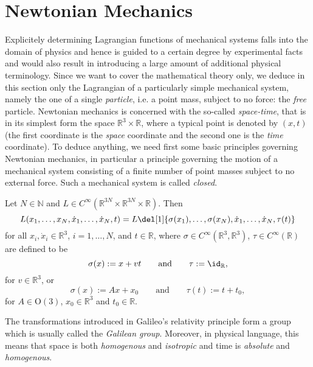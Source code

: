 \section*{Newtonian Mechanics}
Explicitely determining Lagrangian functions of mechanical systems falls into the domain of physics and hence is guided to a certain degree by experimental facts and would also result in introducing a large amount of additional physical terminology. Since we want to cover the mathematical theory only, we deduce in this section only the Lagrangian of a particularly simple mechanical system, namely the one of a single \emph{particle}, i.e. a point mass, subject to no force: the \emph{free} particle. Newtonian mechanics is concerned with the so-called \emph{space-time}, that is in its simplest form the space $\mathbb{R}^3 \times \mathbb{R}$, where a typical point is denoted by $(x,t)$ (the first coordinate is the \emph{space} coordinate and the second one is the \emph{time} coordinate). To deduce anything, we need first some basic principles governing Newtonian mechanics, in particular a principle governing the motion of a mechanical system consisting of a finite number of point masses subject to no external force. Such a mechanical system is called \emph{closed}.

\begin{axiom}
	\label{ax:Galileos_relativity_principle}
	Let $N \in \mathbb{N}$ and $L \in C^\infty(\mathbb{R}^{3N} \times \mathbb{R}^{3N} \times \mathbb{R})$. Then  
	\begin{equation*}
		L(x_1,\dots,x_N,\dot{x}_1,\dots,\dot{x}_N,t) = L\del[1]{\sigma(x_1),\dots,\sigma(x_N),\dot{x}_1,\dots,\dot{x}_N,\tau(t)}
	\end{equation*}
	\noindent for all $x_i,\dot{x}_i \in \mathbb{R}^3$, $i = 1,\dots,N$, and $t \in \mathbb{R}$, where $\sigma \in C^\infty(\mathbb{R}^3,\mathbb{R}^3)$, $\tau \in C^\infty(\mathbb{R})$ are defined to be
	\begin{equation*}
		\sigma(x) := x + vt \qquad \text{and} \qquad \tau := \id_{\mathbb{R}},
	\end{equation*}
	\noindent for $v \in \mathbb{R}^3$, or
	\begin{equation*}
		\sigma(x) := Ax + x_0 \qquad \text{and} \qquad \tau(t) := t + t_0,
	\end{equation*}
	\noindent for $A \in \mathrm{O}(3)$, $x_0 \in \mathbb{R}^3$ and $t_0 \in \mathbb{R}$.
\end{axiom}

\begin{remark}
	The transformations introduced in Galileo's relativity principle form a group which is usually called the \emph{Galilean group}. Moreover, in physical language, this means that space is both \emph{homogenous} and \emph{isotropic} and time is \emph{absolute} and \emph{homogenous}.
\end{remark}

